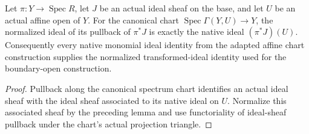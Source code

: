 \begin{lemma}\label{lem:sc0-native-affine-transform-ideal}
\leanok
{}
Let $\pi:Y\to\operatorname{Spec}R$, let $J$ be an actual ideal sheaf on the base,
and let $U$ be an actual affine open of $Y$. For the canonical chart
$\operatorname{Spec}\Gamma(Y,U)\to Y$, the normalized ideal of its pullback of
$\pi^*J$ is exactly the native ideal $(\pi^*J)(U)$. Consequently every native
monomial ideal identity from the adapted affine chart construction supplies the
normalized transformed-ideal identity used for the boundary-open construction.
\end{lemma}
\begin{proof}
Pullback along the canonical spectrum chart identifies an actual ideal sheaf
with the ideal sheaf associated to its native ideal on $U$. Normalize this
associated sheaf by the preceding lemma and use functoriality of ideal-sheaf
pullback under the chart's actual projection triangle.
\end{proof}

